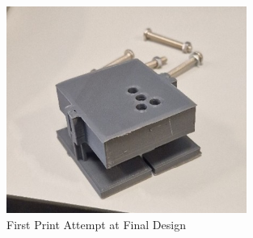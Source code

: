                     \begin{figure}[htbp]
                        \centering
                        \includegraphics[width=0.7\textwidth]{figures/Appendix-CAD/FirstPrintofFinal.jpg}
                        \caption*{First Print Attempt at Final Design} 
                        \label{fig:first-print-final}
                        \end{figure}
                    
                        
                        
